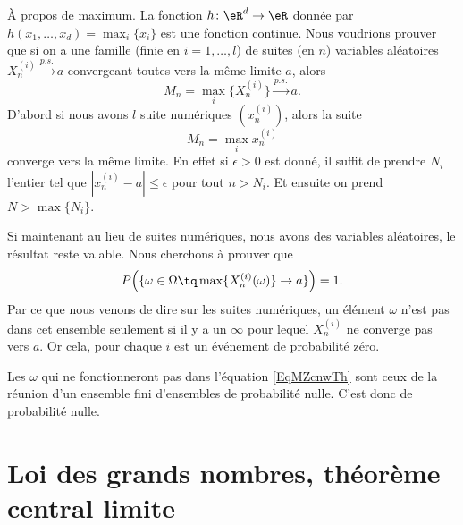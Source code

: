 \begin{example}
	À propos de maximum. La fonction \( h\colon \eR^d\to \eR\) donnée par \( h(x_1,\ldots, x_d)=\max_i\{ x_i \}\) est une fonction continue. Nous voudrions prouver que si on a une famille (finie en \( i=1,\ldots, l\)) de suites (en \( n\)) variables aléatoires \( X^{(i)}_n\stackrel{p.s.}{\longrightarrow} a\) convergeant toutes vers la même limite \( a\), alors
	\begin{equation}
		M_n=\max_i\{ X^{(i)}_n \}\stackrel{p.s.}{\longrightarrow} a.
	\end{equation}
	D'abord si nous avons \( l\) suite numériques \( (x^{(i)}_n)\), alors la suite
	\begin{equation}
		M_n=\max_ix_n^{(i)}
	\end{equation}
	converge vers la même limite. En effet si \( \epsilon>0\) est donné, il suffit de prendre \( N_i\) l'entier tel que \( | x^{(i)}_n-a |\leq \epsilon\) pour tout \( n>N_i\). Et ensuite on prend \( N>\max\{ N_i \}\).

	Si maintenant au lieu de suites numériques, nous avons des variables aléatoires, le résultat reste valable. Nous cherchons à prouver que
	\begin{equation}\label{EqMZcnwTh}
		P\Big( \{ \omega\in \Omega\tq \max\{ X^{(i)}_n(\omega) \}\to a \} \Big)=1.
	\end{equation}
	Par ce que nous venons de dire sur les suites numériques, un élément \( \omega\) n'est pas dans cet ensemble seulement si il y a un \( \infty\) pour lequel \( X^{(i)}_n\) ne converge pas vers \( a\). Or cela, pour chaque \( i\) est un événement de probabilité zéro.

	Les \( \omega\) qui ne fonctionneront pas dans l'équation \eqref{EqMZcnwTh} sont ceux de la réunion d'un ensemble fini d'ensembles de probabilité nulle. C'est donc de probabilité nulle.
\end{example}

\section{Loi des grands nombres, théorème central limite}


